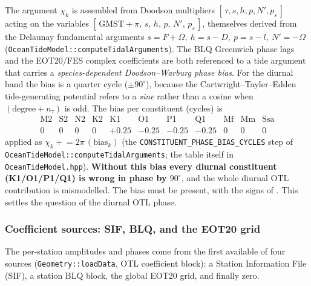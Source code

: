 \documentclass[main.tex]{subfiles}
\begin{document}
The argument $\chi_k$ is assembled from Doodson multipliers
$[\,\tau,s,h,p,N',p_s\,]$ acting on the variables
$[\,\text{GMST}+\pi,\,s,\,h,\,p,\,N',\,p_s\,]$, themselves derived from
the Delaunay fundamental arguments
$s=F+\Omega,\ h=s-D,\ p=s-l,\ N'=-\Omega$
(\texttt{OceanTideModel::computeTidalArguments}).  The BLQ Greenwich phase
lags and the EOT20/FES complex coefficients are both referenced to a
tide argument that carries a \emph{species-dependent Doodson--Warburg
phase bias}.  For the diurnal band the bias is a quarter cycle
($\pm 90^\circ$), because the Cartwright--Tayler--Edden tide-generating
potential refers to a \emph{sine} rather than a cosine when
$(\text{degree}+n_\tau)$ is odd.  The bias per constituent (cycles) is
\begin{equation}
\begin{array}{ccccccccccc}
\text{M2}&\text{S2}&\text{N2}&\text{K2}&\text{K1}&\text{O1}&\text{P1}&\text{Q1}&\text{Mf}&\text{Mm}&\text{Ssa}\\[2pt]
0 & 0 & 0 & 0 & +0.25 & -0.25 & -0.25 & -0.25 & 0 & 0 & 0
\end{array}
\label{eq:sitedisp-dw-bias}
\end{equation}
applied as $\chi_k \mathrel{+}= 2\pi\,(\text{bias}_k)$
(the \texttt{CONSTITUENT\_PHASE\_BIAS\_CYCLES} step of
\texttt{OceanTideModel::computeTidalArguments}; the table itself in
\texttt{OceanTideModel.hpp}).
\textbf{Without this bias every diurnal constituent (K1/O1/P1/Q1) is
wrong in phase by $90^\circ$}, and the whole diurnal OTL contribution is
mismodelled.  The bias must be present, with the signs of
.  This settles the question of the diurnal
OTL phase.

\subsubsection{Coefficient sources: SIF, BLQ, and the EOT20 grid}
\label{sec:sitedisp-otl-coeffs}

The per-station amplitudes and phases come from the first available of
four sources (\texttt{Geometry::loadData}, OTL coefficient block): a
Station Information File (SIF), a station BLQ block, the global EOT20
grid, and finally zero.
\end{document}
